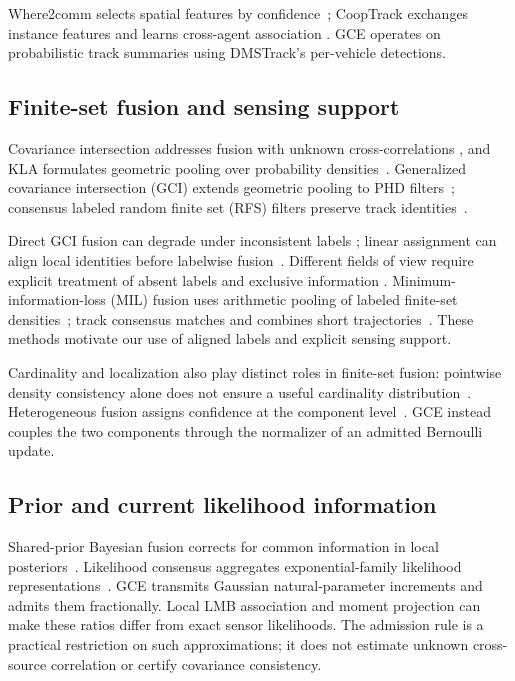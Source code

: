 Where2comm selects spatial features by confidence~\cite{hu2022where2comm};
CoopTrack exchanges instance features and learns cross-agent association
\cite{zhong2025cooptrack}. GCE operates on probabilistic track summaries
using DMSTrack's per-vehicle detections.

\subsection{Finite-set fusion and sensing support}
Covariance intersection addresses fusion with unknown cross-correlations
\cite{julier1997ci}, and KLA formulates geometric pooling over probability
densities~\cite{battistelli2014kla}. Generalized covariance intersection
(GCI) extends geometric pooling to PHD filters~\cite{uney2013emd};
consensus labeled random finite set (RFS) filters preserve track
identities~\cite{fantacci2015consensus}.

Direct GCI fusion can degrade under inconsistent labels
\cite{li2018robust}; linear assignment can align local identities before
labelwise fusion~\cite{li2019labelmatching}.
Different fields of view require explicit treatment of absent labels and
exclusive information
\cite{li2018multiviewlmb,li2020multiview,gao2022differentfov}.
Minimum-information-loss (MIL) fusion uses arithmetic pooling of labeled
finite-set densities~\cite{gao2020mil}; track consensus matches and
combines short trajectories~\cite{nguyen2021tc}. These methods motivate
our use of aligned labels and explicit sensing support.

Cardinality and localization also play distinct roles in finite-set
fusion: pointwise density consistency alone does not ensure a useful
cardinality distribution~\cite{uney2019cardinality}. Heterogeneous fusion
assigns confidence at the component level~\cite{yi2021heterogeneous}.
GCE instead couples the two components through the normalizer of an
admitted Bernoulli update.

\subsection{Prior and current likelihood information}
Shared-prior Bayesian fusion corrects for common information in local
posteriors~\cite{wu2022sharedpriors}. Likelihood consensus aggregates
exponential-family likelihood representations~\cite{hlinka2012likelihood}.
GCE transmits Gaussian natural-parameter increments and admits them
fractionally. Local LMB association and moment projection can make these
ratios differ from exact sensor likelihoods. The admission rule is a
practical restriction on such approximations; it does not estimate
unknown cross-source correlation or certify covariance consistency.
